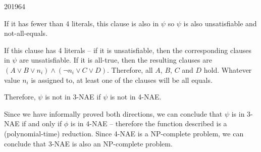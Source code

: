 \documentclass[10pt,\jkfside,a4paper]{article}
\begin{document}
\begin{examquestion}{2019}{6}{4}
\begin{enumerate}[label=(\alph*)]
\begin{itemize}
If it has fewer than 4 literals, this clause is also in $\psi$ so $\psi$ is
also unsatisfiable and not-all-equals.

If this clause has 4 literals -- if it is unsatisfiable, then the
corresponding clauses in $\psi$ are unsatisfiable. If it is all-true, then
the resulting clauses are $(A \vee B \vee n_i) \wedge (\neg n_i \vee C \vee
D)$. Therefore, all $A$, $B$, $C$ and $D$ hold. Whatever value $n_i$ is
assigned to, at least one of the clauses will be all equals.

Therefore, $\psi$ is not in 3-NAE if $\psi$ is not in 4-NAE\@.

\end{itemize}

Since we have informally proved both directions, we can conclude that $\psi$
is in 3-NAE if and only if $\phi$ is in 4-NAE -- therefore the function
described is a (polynomial-time) reduction. Since 4-NAE is a NP-complete
problem, we can conclude that 3-NAE is also an NP-complete problem.

\end{enumerate}

\end{examquestion}
\end{document}
